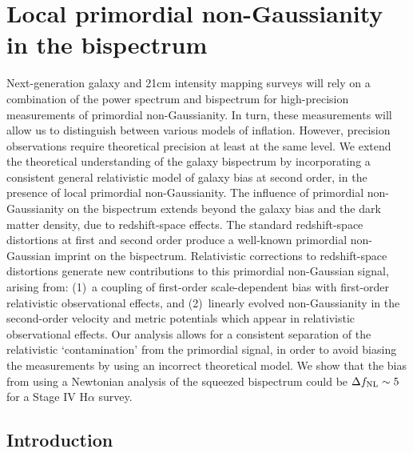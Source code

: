 \chapter{Local primordial non-Gaussianity in the bispectrum}
\label{chapter:localpng}


Next-generation galaxy and 21cm intensity mapping surveys will rely on a combination of the power spectrum and bispectrum for high-precision measurements of primordial non-Gaussianity. In turn, these measurements will allow us to distinguish between various models of inflation. However, precision observations require theoretical precision at least at the same level. We extend the theoretical understanding of the galaxy bispectrum by incorporating a consistent general relativistic model of galaxy bias at second order, in the presence of local primordial non-Gaussianity. {The influence of primordial non-Gaussianity on the bispectrum extends beyond the  galaxy bias and the dark matter density, due to redshift-space effects. The standard redshift-space distortions at first and second order produce a well-known primordial non-Gaussian  imprint on the bispectrum. Relativistic corrections to redshift-space distortions
generate new contributions to this primordial non-Gaussian signal, arising from: (1)~a coupling of first-order scale-dependent bias with first-order relativistic observational effects, and (2)~linearly evolved non-Gaussianity in the second-order velocity and metric potentials which appear in relativistic observational effects.}
Our analysis allows for a consistent separation of the relativistic  `contamination' from the primordial signal, in order to avoid biasing the measurements by using an incorrect theoretical model. We show that the bias from using a Newtonian analysis of the squeezed bispectrum could be $\Delta f_\text{NL}\sim 5$ for a Stage IV H$\alpha$ survey.

\section{Introduction}

